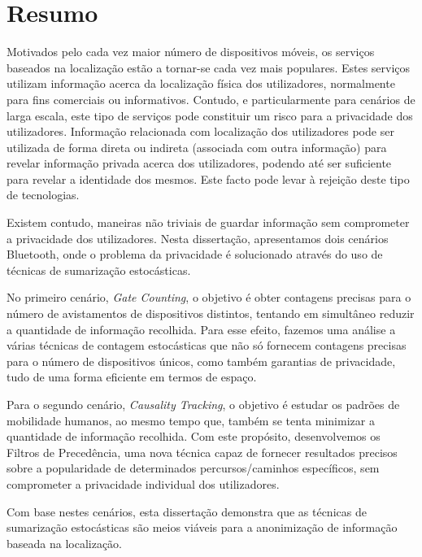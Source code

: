 \chapter*{Resumo}
Motivados pelo cada vez maior número de dispositivos móveis, os
serviços baseados na localização estão a tornar-se cada vez mais
populares.  Estes serviços utilizam informação acerca da
localização física dos utilizadores, normalmente para fins comerciais
ou informativos. Contudo, e particularmente para cenários de larga
escala, este tipo de serviços pode constituir um risco para a
privacidade dos utilizadores. Informação relacionada com localização
dos utilizadores pode ser utilizada de forma direta ou indireta
(associada com outra informação) para revelar informação privada
acerca dos utilizadores, podendo até ser suficiente para revelar a
identidade dos mesmos.  Este facto pode levar à rejeição deste tipo de tecnologias.

Existem contudo, maneiras não triviais de guardar informação sem
comprometer a privacidade dos utilizadores.  Nesta dissertação, apresentamos
dois cenários Bluetooth, onde o problema da privacidade é
solucionado através do uso de técnicas de sumarização estocásticas.

No primeiro cenário, \textit{Gate Counting}, o objetivo é obter
contagens precisas para o número de avistamentos de dispositivos distintos,
tentando em simultâneo reduzir a quantidade de informação
recolhida. Para esse efeito, fazemos uma análise a várias
técnicas de contagem estocásticas que não só fornecem contagens
precisas para o número de dispositivos únicos, como também
garantias de privacidade, tudo de uma forma eficiente em termos de
espaço.

Para o segundo cenário, \textit{Causality Tracking}, o objetivo é
estudar os padrões de mobilidade humanos, ao mesmo tempo que, também
se tenta minimizar a quantidade de informação recolhida.  Com este
propósito, desenvolvemos os Filtros de Precedência, uma nova técnica
capaz de fornecer resultados precisos sobre a popularidade de
determinados percursos/caminhos específicos, sem comprometer a
privacidade individual dos utilizadores.

Com base nestes cenários, esta dissertação demonstra que as técnicas
de sumarização estocásticas são meios viáveis para a anonimização de
informação baseada na localização.

